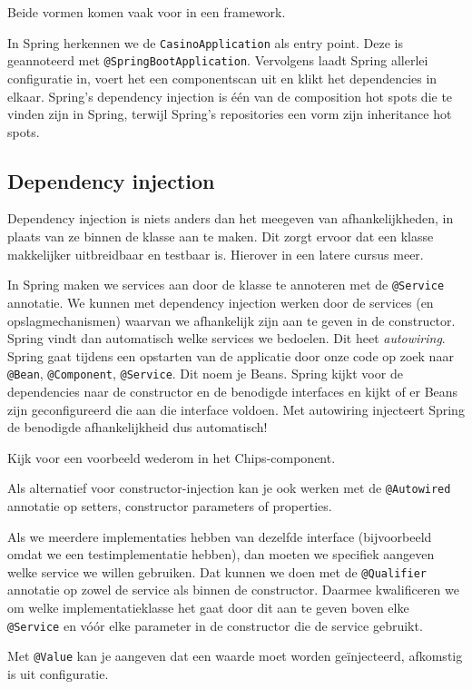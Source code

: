 \documentclass[dutch,a4paper,12pt,doubleside]{book}
\begin{document}
Beide vormen komen vaak voor in een framework.

In Spring herkennen we de \texttt{CasinoApplication} als entry point.
Deze is geannoteerd met \texttt{@SpringBootApplication}. Vervolgens laadt
Spring allerlei configuratie in, voert het een componentscan uit en klikt het dependencies in elkaar.
Spring's dependency injection is één van de composition hot spots die te vinden zijn in Spring,
terwijl Spring's repositories een vorm zijn inheritance hot spots.

\subsection{Dependency injection}
Dependency injection is niets anders dan het meegeven van afhankelijkheden,
in plaats van ze binnen de klasse aan te maken. Dit zorgt ervoor dat een klasse 
makkelijker uitbreidbaar en testbaar is. Hierover in een latere cursus meer.

In Spring maken we services aan door de klasse te annoteren met de \texttt{@Service} annotatie. 
We kunnen met dependency injection werken door de services (en opslagmechanismen) waarvan we afhankelijk zijn 
aan te geven in de constructor. Spring vindt dan automatisch welke services we bedoelen. 
Dit heet \textit{autowiring}.
Spring gaat tijdens een opstarten van de applicatie door onze code op zoek naar 
\texttt{@Bean}, \texttt{@Component}, \texttt{@Service}. Dit noem je Beans. 
Spring kijkt voor de dependencies naar de constructor en de benodigde interfaces 
en kijkt of er Beans zijn geconfigureerd die aan die interface voldoen. Met autowiring 
injecteert Spring de benodigde afhankelijkheid dus automatisch!

Kijk voor een voorbeeld wederom in het Chips-component.

Als alternatief voor constructor-injection kan 
je ook werken met de \texttt{@Autowired} annotatie 
op setters, constructor parameters of properties. 

Als we meerdere implementaties hebben van dezelfde interface 
(bijvoorbeeld omdat we een testimplementatie hebben), 
dan moeten we specifiek aangeven welke service we willen gebruiken. 
Dat kunnen we doen met de \texttt{@Qualifier} annotatie op zowel de service als binnen de constructor. 
Daarmee kwalificeren we om welke implementatieklasse het gaat door 
dit aan te geven boven elke \texttt{@Service} en vóór elke parameter in de 
constructor die de service gebruikt.

Met \texttt{@Value} kan je aangeven dat een waarde moet worden geïnjecteerd,
afkomstig is uit configuratie.
\end{document}
